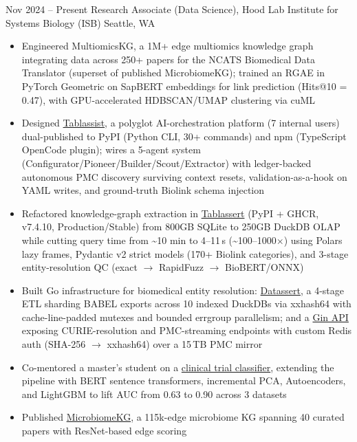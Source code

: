 \documentclass[11pt]{moderncv}
\newcommand{\skyespace}{\vspace{8pt}}
\newcommand{\colorhref}[2]{\href{#1}{\textcolor{linkblue}{#2}}}
\begin{document}
\skyespace
\cventry
{Nov 2024 -- Present}
{Research Associate (Data Science), Hood Lab}
{Institute for Systems Biology (ISB)}
{Seattle, WA}
{}
{%
	\begin{itemize}
		\item Engineered MultiomicsKG, a 1M+ edge multiomics knowledge graph integrating data across 250+ papers for the NCATS Biomedical Data Translator (superset of published MicrobiomeKG); trained an RGAE in PyTorch Geometric on SapBERT embeddings for link prediction (Hits@10 = 0.47), with GPU-accelerated HDBSCAN/UMAP clustering via cuML
		\item Designed \colorhref{https://github.com/SkyeAv/Tablassist}{Tablassist}, a polyglot AI-orchestration platform (7 internal users) dual-published to PyPI (Python CLI, 30+ commands) and npm (TypeScript OpenCode plugin); wires a 5-agent system (Configurator/Pioneer/Builder/Scout/Extractor) with ledger-backed autonomous PMC discovery surviving context resets, validation-as-a-hook on YAML writes, and ground-truth Biolink schema injection
		\item Refactored knowledge-graph extraction in \colorhref{https://skyeav.github.io/Tablassert/}{Tablassert} (PyPI + GHCR, v7.4.10, Production/Stable) from 800GB SQLite to 250GB DuckDB OLAP while cutting query time from \textasciitilde 10 min to 4--11\,s (\textasciitilde 100--1000$\times$) using Polars lazy frames, Pydantic v2 strict models (170+ Biolink categories), and 3-stage entity-resolution QC (exact $\rightarrow$ RapidFuzz $\rightarrow$ BioBERT/ONNX)
		\item Built Go infrastructure for biomedical entity resolution: \colorhref{https://github.com/SkyeAv/datassert}{Datassert}, a 4-stage ETL sharding BABEL exports across 10 indexed DuckDBs via xxhash64 with cache-line-padded mutexes and bounded errgroup parallelism; and a \colorhref{https://github.com/SkyeAv/configurator-api}{Gin API} exposing CURIE-resolution and PMC-streaming endpoints with custom Redis auth (SHA-256 $\rightarrow$ xxhash64) over a 15\,TB PMC mirror
		\item Co-mentored a master's student on a \colorhref{https://github.com/SkyeAv/CTClassifier}{clinical trial classifier}, extending the pipeline with BERT sentence transformers, incremental PCA, Autoencoders, and LightGBM to lift AUC from 0.63 to 0.90 across 3 datasets
		\item Published \colorhref{https://www.frontiersin.org/journals/systems-biology/articles/10.3389/fsysb.2025.1544432/full}{MicrobiomeKG}, a 115k-edge microbiome KG spanning 40 curated papers with ResNet-based edge scoring
	\end{itemize}
}
\end{document}
